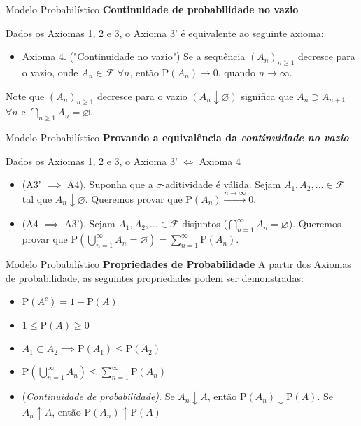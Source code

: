 \documentclass[10pt]{beamer}
\begin{document}
\begin{frame}[fragile]{Modelo Probabilístico}
\textbf{Continuidade de probabilidade no vazio}

Dados os Axiomas 1, 2 e 3, o Axioma 3' é equivalente ao seguinte axioma:
\begin{itemize}
    \item Axioma 4. ("Continuidade no vazio") Se a sequência $(A_n)_{n\geq 1}$
    decresce para o vazio, onde $A_n \in \mathcal{F}$ $\forall n$, então
    $\mathrm{P}(A_n)\rightarrow0$, quando $n \rightarrow \infty$.
\end{itemize}
Note que $(A_n)_{n\geq 1}$ decresce para o vazio $(A_n\downarrow \varnothing)$
significa que $A_n \supset A_{n+1}$ $\forall n$ e $\bigcap_{n\geq 1}A_n = \varnothing$.
\end{frame}

\begin{frame}[fragile]{Modelo Probabilístico}
\textbf{Provando a equivalência da \textit{continuidade no vazio}}

Dados os Axiomas 1, 2 e 3, o Axioma 3' $\iff$ Axioma 4 
\begin{itemize}
    \item (A3' $\implies$ A4). Suponha que a $\sigma$-aditividade é válida.
    Sejam $A_1, A_2, ... \in \mathcal{F}$ tal que
    $A_n\downarrow \varnothing$. Queremos provar que
    $\mathrm{P}(A_n)\xrightarrow{n\rightarrow \infty}0$.
\end{itemize}
\begin{itemize}
    \item (A4 $\implies$ A3'). Sejam $A_1,A_2,... \in \mathcal{F}$ disjuntos
    ($\bigcap_{n=1}^{\infty}A_n=\varnothing$).
    Queremos provar que $\mathrm{P}(\bigcup_{n=1}^{\infty}A_n=\varnothing)
    =\sum_{n=1}^{\infty}\mathrm{P}(A_n)$.
\end{itemize}
\end{frame}

\begin{frame}[fragile]{Modelo Probabilístico}
\textbf{Propriedades de Probabilidade}
A partir dos Axiomas de probabilidade, as seguintes propriedades podem ser demonstradas:
\begin{itemize}
    \item $\mathrm{P}(A^c) = 1 - \mathrm{P}(A)$
    \item $1 \leq \mathrm{P}(A) \geq 0$
    \item $A_1 \subset A_2 \implies \mathrm{P}(A_1) \leq \mathrm{P}(A_2)$
    \item $\mathrm{P}(\bigcup_{n=1}^{\infty}A_n) \leq
    \sum_{n=1}^{\infty}\mathrm{P}(A_n)$
    \item (\textit{Continuidade de probabilidade)}. Se $A_n\downarrow A$, então $\mathrm{P}(A_n) \downarrow \mathrm{P}(A)$. Se $A_n\uparrow A$, então
    $\mathrm{P}(A_n) \uparrow \mathrm{P}(A)$
\end{itemize}
\end{frame}
\end{document}
